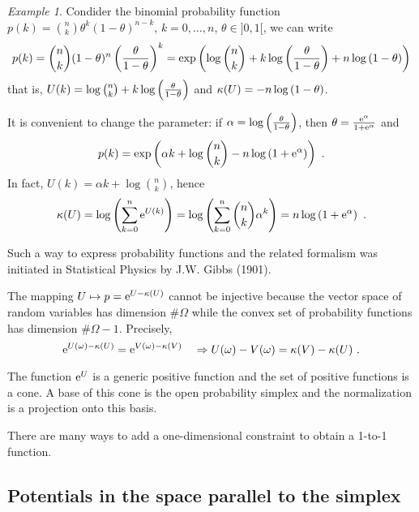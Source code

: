 \documentclass[12pt,a4paper]{amsart}
\theoremstyle{plain}%
\theoremstyle{definition}
\theoremstyle{remark}
\newtheorem{example}{Example}
\begin{document}
  \begin{example}
  Condider the binomial probability function $p(k) = \binom n k \theta^k (1-\theta)^{n-k}$, $k = 0,\dots, n$, $\theta \in ]0,1[$, we can write
  \begin{equation*}
    p(k) = \binom n k (1-\theta)^n \left(\frac \theta {1-\theta}\right)^k = \exp\left(\log \binom n k + k \log\left(\frac \theta {1-\theta}\right) + n \log\left(1-\theta\right)\right)
  \end{equation*}
  that is, $U(k) = \log \binom n k + k \log\left(\frac \theta {1-\theta}\right)$ and $\kappa(U) = - n \log\left(1-\theta\right)$. 

  It is convenient to change the parameter: if $\alpha = \log\left(\frac \theta {1-\theta}\right)$, then $\theta = \frac{\mathrm{e}^\alpha}{1+\mathrm{e}^\alpha}$ and
  \begin{equation*}
  p(k) = \exp\left(\alpha k + \log\binom n k - n \log\left(1+\mathrm{e}^\alpha\right)\right) \ .  
\end{equation*}
In fact, $U(k) = \alpha k + \log \binom n k$, hence
\begin{equation*}
  \kappa(U) = \log\left(\sum_{k=0}^n \mathrm{e}^{U(k)}\right) = \log\left(\sum_{k=0}^n \binom n k \alpha^k\right) = n \log\left(1+\mathrm{e}^\alpha\right) \ .
\end{equation*}
\end{example}

Such a way to express probability functions and the related formalism was initiated in Statistical Physics by J.W. Gibbs (1901).

The mapping $U \mapsto p = \mathrm{e}^{U - \kappa(U)}$ cannot be injective because the vector space of random variables has dimension $\#\Omega$ while the convex set of probability functions has dimension $\#\Omega - 1$. Precisely,
\begin{equation*}
  \mathrm{e}^{U(\omega)-\kappa(U)} = \mathrm{e}^{V(\omega) - \kappa(V)} \quad \Rightarrow U(\omega)-V(\omega) = \kappa(V) - \kappa(U) \ .
\end{equation*}

The function $\mathrm{e}^U$ is a generic positive function and the set of positive functions is a cone. A base of this cone is the open probability simplex and the normalization is a projection onto this basis.

There are many ways to add a one-dimensional constraint to obtain a 1-to-1 function. 

\subsection{Potentials in the space parallel to the simplex}
\end{document}
